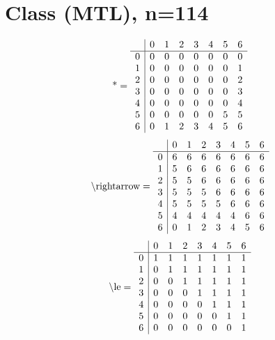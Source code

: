 \documentclass[11pt]{article}
\begin{document}
\section{Class (MTL), n=114}
\[\text{*} = 
\begin{array}{r | r r r r r r r}
 & 0 & 1 & 2 & 3 & 4 & 5 & 6 \\ \hline
0 & 0 & 0 & 0 & 0 & 0 & 0 & 0 \\
1 & 0 & 0 & 0 & 0 & 0 & 0 & 1 \\
2 & 0 & 0 & 0 & 0 & 0 & 0 & 2 \\
3 & 0 & 0 & 0 & 0 & 0 & 0 & 3 \\
4 & 0 & 0 & 0 & 0 & 0 & 0 & 4 \\
5 & 0 & 0 & 0 & 0 & 0 & 5 & 5 \\
6 & 0 & 1 & 2 & 3 & 4 & 5 & 6 \\
\end{array}
\]
\[\text{\textbackslash rightarrow} = 
\begin{array}{r | r r r r r r r}
 & 0 & 1 & 2 & 3 & 4 & 5 & 6 \\ \hline
0 & 6 & 6 & 6 & 6 & 6 & 6 & 6 \\
1 & 5 & 6 & 6 & 6 & 6 & 6 & 6 \\
2 & 5 & 5 & 6 & 6 & 6 & 6 & 6 \\
3 & 5 & 5 & 5 & 6 & 6 & 6 & 6 \\
4 & 5 & 5 & 5 & 5 & 6 & 6 & 6 \\
5 & 4 & 4 & 4 & 4 & 4 & 6 & 6 \\
6 & 0 & 1 & 2 & 3 & 4 & 5 & 6 \\
\end{array}
\]
\[\text{\textbackslash le} = 
\begin{array}{r | r r r r r r r}
 & 0 & 1 & 2 & 3 & 4 & 5 & 6 \\ \hline
0 & 1 & 1 & 1 & 1 & 1 & 1 & 1 \\
1 & 0 & 1 & 1 & 1 & 1 & 1 & 1 \\
2 & 0 & 0 & 1 & 1 & 1 & 1 & 1 \\
3 & 0 & 0 & 0 & 1 & 1 & 1 & 1 \\
4 & 0 & 0 & 0 & 0 & 1 & 1 & 1 \\
5 & 0 & 0 & 0 & 0 & 0 & 1 & 1 \\
6 & 0 & 0 & 0 & 0 & 0 & 0 & 1 \\
\end{array}
\]
\end{document}
